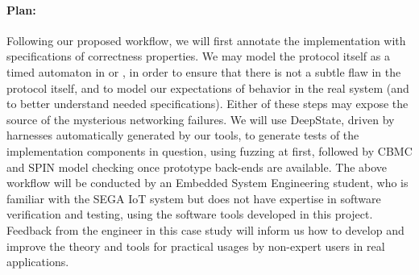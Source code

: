 \paragraph{Plan:}

Following our proposed workflow, we will first annotate the implementation with specifications of correctness properties.  We may model the protocol itself as a timed automaton in \uppaal or \prism, in order to ensure that there is not a subtle flaw in the protocol itself, and to model our expectations of behavior in the real system (and to better understand needed specifications).
Either of these steps may expose the source of the mysterious networking failures.
We will use DeepState, driven by harnesses automatically generated by our tools, to generate tests of the implementation components in question, using fuzzing at first, followed by CBMC and SPIN model checking once prototype back-ends are available.
%
%
The above workflow will be conducted by an Embedded System Engineering student, who is familiar with the SEGA IoT system but does not have expertise in software verification and testing, using the software tools developed in this project.
Feedback from the engineer in this case study will inform us how to develop and improve the theory and tools for practical usages by non-expert users in real applications.



